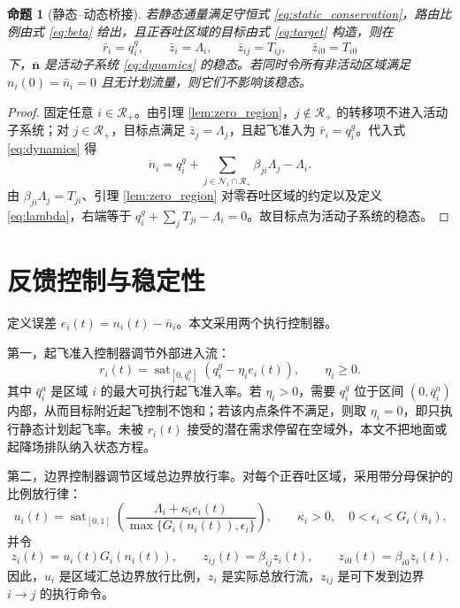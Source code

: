 \documentclass[a4paper,12pt]{article}
\theoremstyle{plain}
\newtheorem{proposition}[theorem]{命题}
\theoremstyle{definition}
\theoremstyle{remark}
\begin{document}
\begin{proposition}[静态--动态桥接]\label{prop:bridge}
若静态通量满足守恒式 \eqref{eq:static_conservation}，路由比例由式 \eqref{eq:beta} 给出，且正吞吐区域的目标由式 \eqref{eq:target} 构造，则在
\[
    \bar r_i=q_i^g,\qquad
    \bar z_i=\Lambda_i,\qquad
    \bar z_{ij}=T_{ij},\qquad
    \bar z_{i0}=T_{i0}
\]
下，$\bar{\bm n}$ 是活动子系统 \eqref{eq:dynamics} 的稳态。若同时令所有非活动区域满足 $n_i(0)=\bar n_i=0$ 且无计划流量，则它们不影响该稳态。
\end{proposition}

\begin{proof}
固定任意 $i\in\mathcal R_+$。由引理 \ref{lem:zero_region}，$j\notin\mathcal R_+$ 的转移项不进入活动子系统；对 $j\in\mathcal R_+$，目标点满足 $\bar z_j=\Lambda_j$，且起飞准入为 $\bar r_i=q_i^g$。代入式 \eqref{eq:dynamics} 得
\begin{equation}
    \dot n_i
    =
    q_i^g+\sum_{j\in\mathcal N_i\cap\mathcal R_+}\beta_{ji}\Lambda_j-\Lambda_i.
\end{equation}
由 $\beta_{ji}\Lambda_j=T_{ji}$、引理 \ref{lem:zero_region} 对零吞吐区域的约定以及定义 \eqref{eq:lambda}，右端等于 $q_i^g+\sum_jT_{ji}-\Lambda_i=0$。故目标点为活动子系统的稳态。
\end{proof}

\section{反馈控制与稳定性}

定义误差 $e_i(t)=n_i(t)-\bar n_i$。本文采用两个执行控制器。

第一，起飞准入控制器调节外部进入流：
\begin{equation}\label{eq:takeoff_controller}
    r_i(t)
    =
    \operatorname{sat}_{[0,\bar q_i^a]}
    \left(q_i^g-\eta_i e_i(t)\right),
    \qquad
    \eta_i\ge0 .
\end{equation}
其中 $\bar q_i^a$ 是区域 $i$ 的最大可执行起飞准入率。若 $\eta_i>0$，需要 $q_i^g$ 位于区间 $(0,\bar q_i^a)$ 内部，从而目标附近起飞控制不饱和；若该内点条件不满足，则取 $\eta_i=0$，即只执行静态计划起飞率。未被 $r_i(t)$ 接受的潜在需求停留在空域外，本文不把地面或起降场排队纳入状态方程。

第二，边界控制器调节区域总边界放行率。对每个正吞吐区域，采用带分母保护的比例放行律：
\begin{equation}\label{eq:boundary_controller}
    u_i(t)
    =
    \operatorname{sat}_{[0,1]}
    \left(
    \frac{\Lambda_i+\kappa_i e_i(t)}
    {\max\{G_i(n_i(t)),\epsilon_i\}}
    \right),
    \qquad
    \kappa_i>0,\quad 0<\epsilon_i<G_i(\bar n_i).
\end{equation}
并令
\begin{equation}\label{eq:z_controller}
    z_i(t)=u_i(t)G_i(n_i(t)),
    \qquad
    z_{ij}(t)=\beta_{ij}z_i(t),
    \qquad
    z_{i0}(t)=\beta_{i0}z_i(t).
\end{equation}
因此，$u_i$ 是区域汇总边界放行比例，$z_i$ 是实际总放行流，$z_{ij}$ 是可下发到边界 $i\to j$ 的执行命令。
\end{document}
